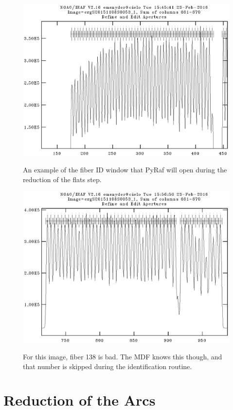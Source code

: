 \documentclass[12pt]{report}
\begin{document}
\begin{figure}[h]
\centering
\includegraphics{apertures2.eps}
\label{fig:ap2}
\caption[Zoomed In Fiber ID Example]{An example of the fiber ID window that PyRaf will open during the reduction of the flats step.}
\end{figure}

\begin{figure}[h]
\centering
\includegraphics{badfiber.eps}
\label{fig:bad}
\caption[Example Image of a Bad Fiber]{For this image, fiber 138 is bad. The MDF knows this though, and that number is skipped during the identification routine.}
\end{figure}


\section{Reduction of the Arcs}
\end{document}
